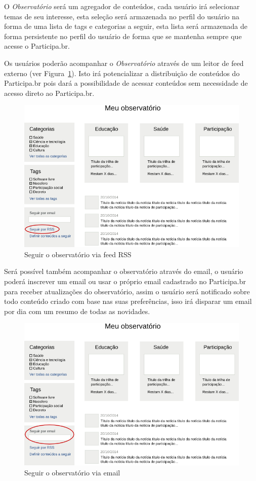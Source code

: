 \documentclass[12pt]{article}
\begin{document}
O {\it Observatório} será um agregador de conteúdos, cada usuário irá selecionar
temas de seu interesse, esta seleção será armazenada no perfil do usuário na
forma de uma lista de tags e categorias a seguir, esta lista será armazenada
de forma persistente no perfil do usuário de forma que se mantenha sempre que
acesse o Participa.br.

Os usuários poderão acompanhar o {\it Observatório} através de um leitor de
feed\cite{rss} externo (ver Figura~\ref{observatorio-feed}). Isto irá
potencializar a distribuição de conteúdos do Participa.br pois dará a
possibilidade de acessar conteúdos sem necessidade de acesso direto ao
Participa.br.

\begin{figure}[h!]
\center
\includegraphics[scale=0.60]{observatorio-feed.png}
\caption{Seguir o observatório via feed RSS}
\label{observatorio-feed}
\end{figure}

Será possível também acompanhar o observatório através do email, o usuário
poderá inscrever um email ou usar o próprio email cadastrado no Participa.br
para receber atualizações do observatório, assim o usuário será notificado
sobre todo conteúdo criado com base nas suas preferências, isso irá disparar
um email por dia com um resumo de todas as novidades.

\begin{figure}[h!]
\center
\includegraphics[scale=0.60]{observatorio-email.png}
\caption{Seguir o observatório via email}
\label{observatorio-email}
\end{figure}
\end{document}
